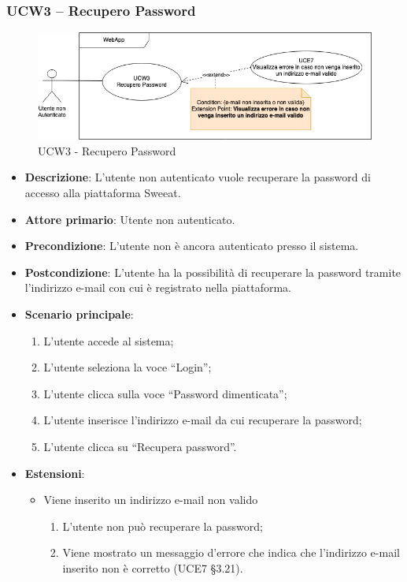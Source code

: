 \subsubsection{UCW3 – Recupero Password}
\begin{figure}[!h]
\centering
\includegraphics[scale=0.5]{UC_images/UCW3.png}
\caption{UCW3 - Recupero Password}
\end{figure}
\begin{itemize}
\item \textbf{Descrizione}: L'utente non autenticato vuole recuperare la password di accesso alla piattaforma Sweeat.
\item \textbf{Attore primario}: Utente non autenticato.
\item \textbf{Precondizione}: L’utente non è ancora autenticato presso il sistema.
\item \textbf{Postcondizione}: L’utente ha la possibilità di recuperare la password tramite l'indirizzo e-mail con cui è registrato nella piattaforma.

\item \textbf{Scenario principale}:
\begin{enumerate}
\item L’utente accede al sistema;
\item L’utente seleziona la voce “Login”;
\item L’utente clicca sulla voce “Password dimenticata”;
\item L’utente inserisce l’indirizzo e-mail da cui recuperare la password;
\item L’utente clicca su “Recupera password”. 
\end{enumerate}

\item \textbf{Estensioni}:
\begin{itemize}
\item Viene inserito un indirizzo e-mail non valido 
\begin{enumerate}
	\item L’utente non può recuperare la password;
	\item Viene mostrato un messaggio d’errore che indica che l’indirizzo e-mail inserito non è corretto (UCE7 §3.21).
\end{enumerate}
\end{itemize}
\end{itemize}

\pagebreak